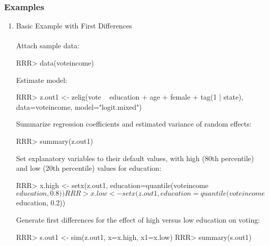\subsubsection{Examples}

\begin{enumerate}
\item Basic Example with First Differences \\
\\
Attach sample data: \\
\begin{Schunk}
\begin{Sinput}
RRR> data(voteincome)
\end{Sinput}
\end{Schunk}
Estimate model:
\begin{Schunk}
\begin{Sinput}
RRR> z.out1 <- zelig(vote ~ education + age + female + tag(1 | state), data=voteincome, model="logit.mixed")
\end{Sinput}
\end{Schunk}

\noindent Summarize regression coefficients and estimated variance of random effects:\\
\begin{Schunk}
\begin{Sinput}
RRR> summary(z.out1)
\end{Sinput}
\end{Schunk}
Set explanatory variables to their default values, with high (80th percentile) and low (20th percentile) values for education:\\

\begin{Schunk}
\begin{Sinput}
RRR> x.high <- setx(z.out1, education=quantile(voteincome$education, 0.8))
RRR> x.low <- setx(z.out1, education=quantile(voteincome$education, 0.2))
\end{Sinput}
\end{Schunk}
Generate first differences for the effect of high versus low education on voting: \\

\begin{Schunk}
\begin{Sinput}
RRR> s.out1 <- sim(z.out1, x=x.high, x1=x.low)
RRR> summary(s.out1)
\end{Sinput}
\end{Schunk}

\end{enumerate}


